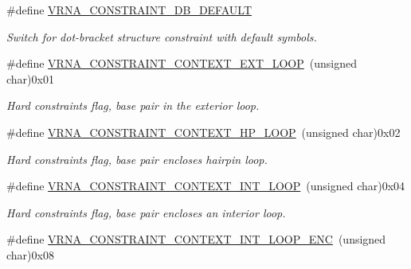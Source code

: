 \begin{DoxyCompactItemize}
\#define \mbox{\hyperlink{group__hard__constraints_ga1c3864bdc92147a4d93de2b1b4356177}{V\+R\+N\+A\+\_\+\+C\+O\+N\+S\+T\+R\+A\+I\+N\+T\+\_\+\+D\+B\+\_\+\+D\+E\+F\+A\+U\+LT}}
\begin{DoxyCompactList}\small\item\em Switch for dot-\/bracket structure constraint with default symbols. \end{DoxyCompactList}\item 
\mbox{\label{group__hard__constraints_ga9418eda62a5dec070896702c279d2548}} 
\#define \mbox{\hyperlink{group__hard__constraints_ga9418eda62a5dec070896702c279d2548}{V\+R\+N\+A\+\_\+\+C\+O\+N\+S\+T\+R\+A\+I\+N\+T\+\_\+\+C\+O\+N\+T\+E\+X\+T\+\_\+\+E\+X\+T\+\_\+\+L\+O\+OP}}~(unsigned char)0x01
\begin{DoxyCompactList}\small\item\em Hard constraints flag, base pair in the exterior loop. \end{DoxyCompactList}\item 
\mbox{\label{group__hard__constraints_ga79203702b197b6b9d3b78eed40663eb1}} 
\#define \mbox{\hyperlink{group__hard__constraints_ga79203702b197b6b9d3b78eed40663eb1}{V\+R\+N\+A\+\_\+\+C\+O\+N\+S\+T\+R\+A\+I\+N\+T\+\_\+\+C\+O\+N\+T\+E\+X\+T\+\_\+\+H\+P\+\_\+\+L\+O\+OP}}~(unsigned char)0x02
\begin{DoxyCompactList}\small\item\em Hard constraints flag, base pair encloses hairpin loop. \end{DoxyCompactList}\item 
\mbox{\label{group__hard__constraints_ga21feeab3a9e5fa5a9e3d9ac0fcf5994f}} 
\#define \mbox{\hyperlink{group__hard__constraints_ga21feeab3a9e5fa5a9e3d9ac0fcf5994f}{V\+R\+N\+A\+\_\+\+C\+O\+N\+S\+T\+R\+A\+I\+N\+T\+\_\+\+C\+O\+N\+T\+E\+X\+T\+\_\+\+I\+N\+T\+\_\+\+L\+O\+OP}}~(unsigned char)0x04
\begin{DoxyCompactList}\small\item\em Hard constraints flag, base pair encloses an interior loop. \end{DoxyCompactList}\item 
\mbox{\label{group__hard__constraints_ga0536288e04ff6332ecdc23ca4705402b}} 
\#define \mbox{\hyperlink{group__hard__constraints_ga0536288e04ff6332ecdc23ca4705402b}{V\+R\+N\+A\+\_\+\+C\+O\+N\+S\+T\+R\+A\+I\+N\+T\+\_\+\+C\+O\+N\+T\+E\+X\+T\+\_\+\+I\+N\+T\+\_\+\+L\+O\+O\+P\+\_\+\+E\+NC}}~(unsigned char)0x08

\end{DoxyCompactItemize}
